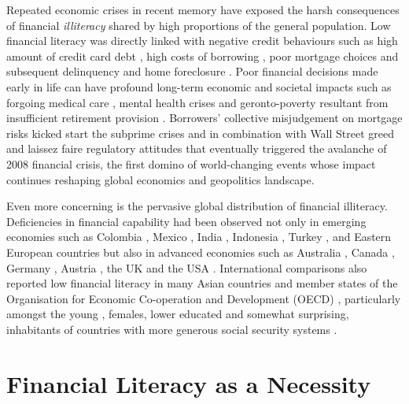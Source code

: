 \documentclass[a4paper,11pt,UKenglish,twoside,openright]{report}\usepackage[]{graphicx}\usepackage[]{color}
\begin{document}
Repeated economic crises in recent memory have exposed the harsh consequences of financial \emph{illiteracy} shared by high proportions of the general population. Low financial literacy was directly linked with negative credit behaviours such as high amount of credit card debt \parencite{norvilitis:2010}, high costs of borrowing \parencite{huston:2012, pak:2018}, poor mortgage choices \parencite{cox:2015} and subsequent delinquency and home foreclosure \parencite{agarwal:2015a, gerardi:2010}. Poor financial decisions made early in life can have profound long-term economic and societal impacts \parencite{montoya:2013} such as forgoing medical care \parencite{lusardi:2015}, mental health crises \parencite{stone:2018} and geronto-poverty resultant from insufficient retirement provision \parencite{lusardi:2007, lusardi:2008}. Borrowers' collective misjudgement on mortgage risks kicked start the subprime crises and in combination with Wall Street greed and laissez faire regulatory attitudes that eventually triggered the avalanche of 2008 financial crisis, the first domino of world-changing events whose impact continues reshaping global economics and geopolitics landscape.

Even more concerning is the pervasive global distribution of financial illiteracy. Deficiencies in financial capability had been observed not only in emerging economies \parencite{karakurumozdemir:2019} such as Colombia \parencite{caoalvira:2020}, Mexico \parencite{arceogomez:2017, bohm:2021}, India \parencite{agarwal:2015b, kiliyanni:2016, utkarsh:2020}, Indonesia \parencite{cole:2009, khoirunnisaa:2020}, Turkey \parencite{akbenselcuk:2014}, and Eastern European countries \parencite{belas:2016, opletalova:2015, reiter:2020} but also in advanced economies such as Australia \parencite{ali:2014, taylor:2013, thomson:2017}, Canada \parencite{boisclair:2017}, Germany \parencite{bucherkoenen:2017, erner:2016}, Austria \parencite{silgoner:2015}, the UK \parencite{barnard:2021} and the USA \parencite{breitbach:2016, gale:2012, lusardi:2010}. International comparisons also reported low financial literacy in many Asian countries \parencite{yoshino:2015} and member states of the Organisation for Economic Co-operation and Development (OECD) \parencite{cupak:2018a, lusardi:2015a}, particularly amongst the young \parencite{debeckker:2019}, females, lower educated \parencite{klapper:2019} and somewhat surprising, inhabitants of countries with more generous social security systems \parencite{jappelli:2010}.

\section{Financial Literacy as a Necessity}
\end{document}
